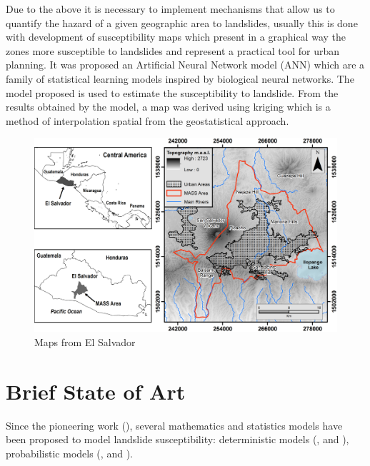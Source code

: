\documentclass[11pt,twoside]{rmta2010esp}%
\begin{document}
Due to the above it is necessary to implement mechanisms that allow us to quantify the hazard of a given geographic area to landslides, usually this is done with development of susceptibility maps which present in a graphical way the zones more susceptible to landslides and represent a practical tool for urban planning. It was proposed an Artificial Neural Network model (ANN) which are a family of statistical learning models inspired by biological neural networks. The model proposed is used to estimate the susceptibility to landslide. From the results obtained by the model, a map was derived using kriging which is a method of interpolation spatial from the geostatistical approach. 


 \begin{center}
  \begin{figure}
   \centering
   \includegraphics[scale=0.75]{MASS_mapa_1}
   \caption{\small{Maps from El Salvador}}
   \label{fig:mass01}
  \end{figure}
 \end{center}




\section{Brief State of Art}
\label{sec:brief}
Since the pioneering work (\cite{Carrara1983403}), several mathematics and statistics models have been proposed to model landslide susceptibility: deterministic models (\cite{hessd-10-12643-2013},  \cite{doi:10.1080/19475705.2010.498151} and \cite{Neu2012511}), probabilistic models (\cite{Bern198839}, \cite{Chung2003451} and \cite{doi:10.1080/01431160310001618734} ). 
\end{document}
